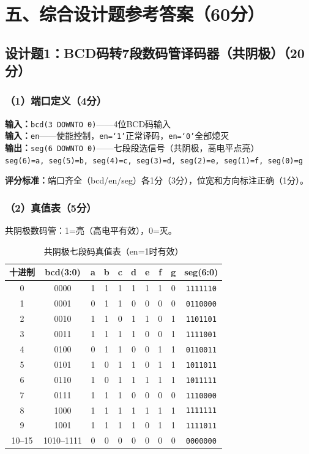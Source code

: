 \section{五、综合设计题参考答案（60分）}

\subsection*{设计题1：BCD码转7段数码管译码器（共阴极）（20分）}

\subsubsection*{（1）端口定义（4分）}

\textbf{输入：}\texttt{bcd(3 DOWNTO 0)}——4位BCD码输入\\
\textbf{输入：}\texttt{en}——使能控制，\texttt{en=`1'}正常译码，\texttt{en=`0'}全部熄灭\\
\textbf{输出：}\texttt{seg(6 DOWNTO 0)}——七段段选信号（共阴极，高电平点亮）\\
\texttt{seg(6)=a, seg(5)=b, seg(4)=c, seg(3)=d, seg(2)=e, seg(1)=f, seg(0)=g}

\textbf{评分标准：}端口齐全（bcd/en/seg）各1分（3分），位宽和方向标注正确（1分）。

\subsubsection*{（2）真值表（5分）}

共阴极数码管：1=亮（高电平有效），0=灭。

\begin{table}[h]
\centering
\caption{共阴极七段码真值表（en=1时有效）}
\begin{tabular}{|c|c|c|c|c|c|c|c|c|c|}
\hline
\textbf{十进制} & \textbf{bcd(3:0)} & \textbf{a} & \textbf{b} & \textbf{c} & \textbf{d} & \textbf{e} & \textbf{f} & \textbf{g} & \textbf{seg(6:0)} \\
\hline
0 & 0000 & 1 & 1 & 1 & 1 & 1 & 1 & 0 & \texttt{1111110} \\
1 & 0001 & 0 & 1 & 1 & 0 & 0 & 0 & 0 & \texttt{0110000} \\
2 & 0010 & 1 & 1 & 0 & 1 & 1 & 0 & 1 & \texttt{1101101} \\
3 & 0011 & 1 & 1 & 1 & 1 & 0 & 0 & 1 & \texttt{1111001} \\
4 & 0100 & 0 & 1 & 1 & 0 & 0 & 1 & 1 & \texttt{0110011} \\
5 & 0101 & 1 & 0 & 1 & 1 & 0 & 1 & 1 & \texttt{1011011} \\
6 & 0110 & 1 & 0 & 1 & 1 & 1 & 1 & 1 & \texttt{1011111} \\
7 & 0111 & 1 & 1 & 1 & 0 & 0 & 0 & 0 & \texttt{1110000} \\
8 & 1000 & 1 & 1 & 1 & 1 & 1 & 1 & 1 & \texttt{1111111} \\
9 & 1001 & 1 & 1 & 1 & 1 & 0 & 1 & 1 & \texttt{1111011} \\
10--15 & 1010--1111 & 0 & 0 & 0 & 0 & 0 & 0 & 0 & \texttt{0000000} \\
\hline
\end{tabular}
\end{table}

